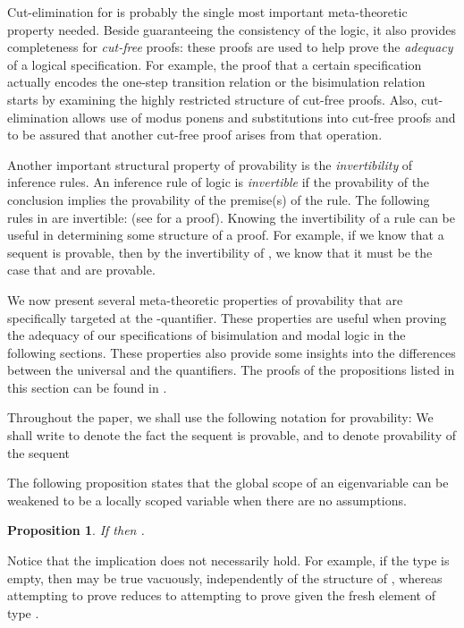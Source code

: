 \documentclass{acmtrans2m}
\newtheorem{proposition}[theorem]{Proposition}
\begin{document}
Cut-elimination for  \cite{miller05tocl,tiu04phd} is probably
the single most important meta-theoretic property needed.  Beside
guaranteeing the consistency of the logic, it also provides
completeness for {\em cut-free} proofs: these proofs are 
used to help prove the {\em adequacy} of a logical specification.  For
example, the proof that a certain specification actually encodes the
one-step transition relation or the bisimulation relation starts by
examining the highly restricted structure of cut-free proofs.  Also,
cut-elimination allows use of modus ponens and substitutions into
cut-free proofs and to be assured that another cut-free proof arises
from that operation.

Another important structural property of provability is the {\em
invertibility} of inference rules.  An inference rule of logic is {\em
invertible} if the provability of the conclusion implies the
provability of the premise(s) of the rule.  The following rules in
 are invertible:  (see \cite{tiu04phd} for a proof).  Knowing the
invertibility of a rule can be useful in determining some structure of
a proof.  For example, if we know that a sequent  is provable, then by the invertibility of , we know
that it must be the case that  and
 are provable.

We now present several meta-theoretic properties of provability that
are specifically targeted at the -quantifier.  These
properties are useful when proving the adequacy of our
specifications of bisimulation and modal logic in the following
sections.  These properties also provide some insights into
the differences between the universal and the  quantifiers.  The
proofs of the propositions listed in this section can be found in 
\cite{tiu04phd}.

Throughout the paper, we shall use the following notation for provability:
We shall write  
to denote the fact the sequent  is provable, and 
 to denote provability of the sequent 

The following proposition states that the global scope of an
eigenvariable can be weakened to be a locally scoped variable when
there are no assumptions.

\begin{proposition}
\label{prop:forall nabla}
If   then .
\end{proposition}

Notice that the implication  does not necessarily hold.   For example, if the type  is
empty, then  may be true vacuously, independently of the
structure of , whereas attempting to prove  reduces to
attempting to prove  given the fresh element  of type . 
\end{document}
